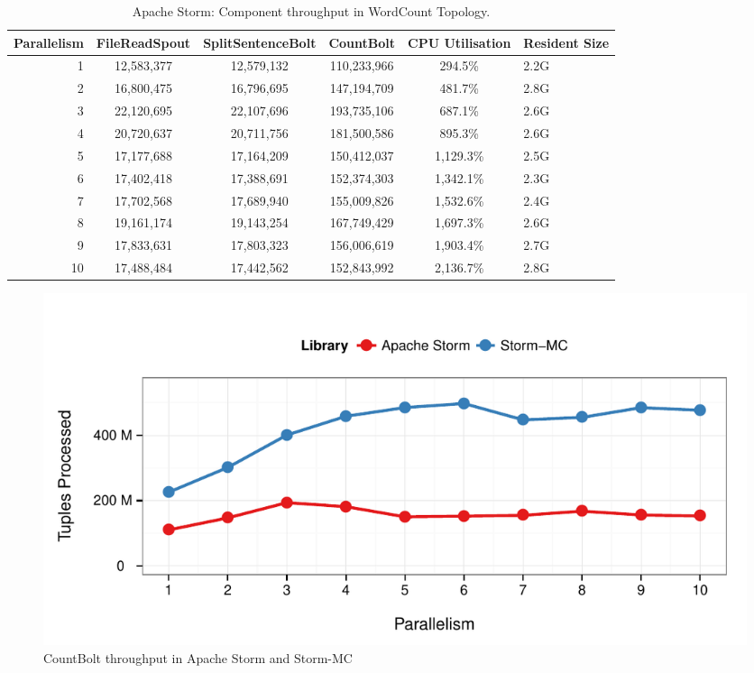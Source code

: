 \documentclass[bsc,twoside,singlespacing,normalheadings,parskip]{infthesis}\usepackage[]{graphicx}\usepackage[]{color}
\makeatletter
\def\maxwidth{ %
  \ifdim\Gin@nat@width>\linewidth
    \linewidth
  \else
    \Gin@nat@width
  \fi
}
\newenvironment{knitrout}{}{} %
\makeatother
\begin{document}
\begin{table}[!htb]
\begin{adjustwidth}{-0.5in}{-0.5in}
\centering
\small
\begin{tabular}{@{}rccccl@{}}
    \textbf{Parallelism} & \textbf{FileReadSpout} & \textbf{SplitSentenceBolt} & \textbf{CountBolt} & \textbf{CPU Utilisation} & \textbf{Resident Size} \\ \toprule
    1 & {12,583,377} & {12,579,132} & {110,233,966} & {294.5\%} & {2.2G} \\
    2 & {16,800,475} & {16,796,695} & {147,194,709} & {481.7\%} & {2.8G} \\
    3 & {22,120,695} & {22,107,696} & {193,735,106} & {687.1\%} & {2.6G} \\
    4 & {20,720,637} & {20,711,756} & {181,500,586} & {895.3\%} & {2.6G} \\
	5 & {17,177,688} & {17,164,209} & {150,412,037} & {1,129.3\%} & {2.5G} \\
	6 & {17,402,418} & {17,388,691} & {152,374,303} & {1,342.1\%} & {2.3G} \\
	7 & {17,702,568} & {17,689,940} & {155,009,826} & {1,532.6\%} & {2.4G} \\
	8 & {19,161,174} & {19,143,254} & {167,749,429} & {1,697.3\%} & {2.6G} \\
	9 & {17,833,631} & {17,803,323} & {156,006,619} & {1,903.4\%} & {2.7G} \\
	10 & {17,488,484} & {17,442,562} & {152,843,992} & {2,136.7\%} & {2.8G} \\
\end{tabular}
\caption{Apache Storm: Component throughput in WordCount Topology.}
\label{table:storm_wordcount}
\end{adjustwidth}
\end{table}

\begin{knitrout}
\color{fgcolor}\begin{figure}[!htb]

{\centering \includegraphics[width=\maxwidth]{figure/countbolt-plot-1} 

}

\caption[CountBolt throughput in Apache Storm and Storm-MC]{CountBolt throughput in Apache Storm and Storm-MC}\label{fig:countbolt-plot}
\end{figure}


\end{knitrout}
\end{document}
